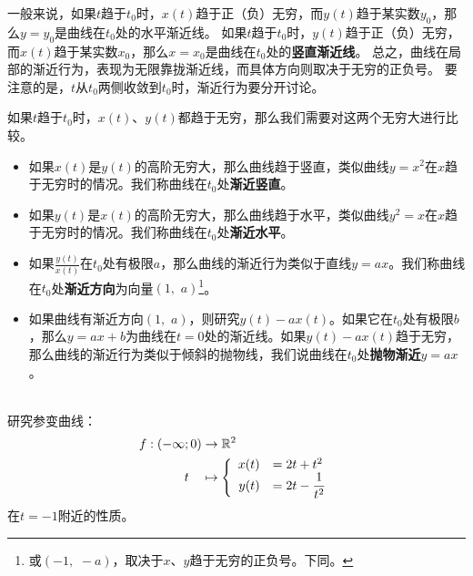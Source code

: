 \documentclass[12pt,UTF8]{ctexbook}
\begin{document}
一般来说，如果$t$趋于$t_0$时，$x(t)$趋于正（负）无穷，而$y(t)$趋于某实数$y_0$，那么$y = y_0$是曲线在$t_0$处的水平渐近线。
如果$t$趋于$t_0$时，$y(t)$趋于正（负）无穷，而$x(t)$趋于某实数$x_0$，那么$x = x_0$是曲线在$t_0$处的\textbf{竖直渐近线}。
总之，曲线在局部的渐近行为，表现为无限靠拢渐近线，而具体方向则取决于无穷的正负号。
要注意的是，$t$从$t_0$两侧收敛到$t_0$时，渐近行为要分开讨论。

如果$t$趋于$t_0$时，$x(t)$、$y(t)$都趋于无穷，那么我们需要对这两个无穷大进行比较。
\begin{itemize}
    \item 如果$x(t)$是$y(t)$的高阶无穷大，那么曲线趋于竖直，类似曲线$y = x^2$在$x$趋于无穷时的情况。我们称曲线在$t_0$处\textbf{渐近竖直}。
    \item 如果$y(t)$是$x(t)$的高阶无穷大，那么曲线趋于水平，类似曲线$y^2 = x$在$x$趋于无穷时的情况。我们称曲线在$t_0$处\textbf{渐近水平}。
    \item 如果$\frac{y(t)}{x(t)}$在$t_0$处有极限$a$，那么曲线的渐近行为类似于直线$y = ax$。我们称曲线在$t_0$处\textbf{渐近方向}为向量$(1,\,\,a)$\footnote{或$(-1,\,\,-a)$，取决于$x$、$y$趋于无穷的正负号。下同。}。
    \item 如果曲线有渐近方向$(1, \,\,a)$，则研究$y(t) - ax(t)$。如果它在$t_0$处有极限$b$，那么$y = ax + b$为曲线在$t=0$处的渐近线。如果$y(t) - ax(t)$趋于无穷，那么曲线的渐近行为类似于倾斜的抛物线，我们说曲线在$t_0$处\textbf{抛物渐近}$y = ax$。
\end{itemize}

\begin{et}
    \mbox{} \\
    研究参变曲线：%
    \begin{align*}
        f: (-\infty;0) &\rightarrow \mathbb{R}^2 \\
        t\quad &\mapsto\left\{
            \begin{array}[]{rl}
                x(t) &=2t + t^2 \\
                y(t) &\displaystyle = 2t - \frac{1}{t^2}\\
            \end{array}
        \right.
    \end{align*}
    在$t=-1$附近的性质。
\end{et}
\end{document}
